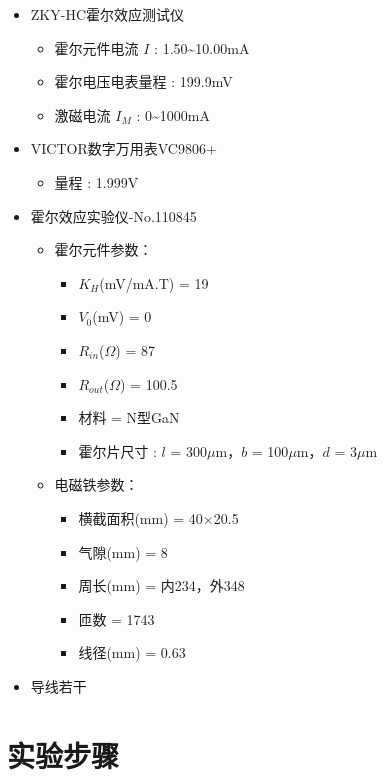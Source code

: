 \documentclass[UTF8]{ctexart}
\begin{document}
\begin{itemize}
    \item ZKY-HC霍尔效应测试仪
    \begin{itemize}
        \item 霍尔元件电流 $I$ : 1.50\~{}10.00mA
        \item 霍尔电压电表量程 : 199.9mV
        \item 激磁电流 $I_M$ : 0\~{}1000mA
    \end{itemize}
    \item VICTOR数字万用表VC9806+
    \begin{itemize}
        \item 量程 : 1.999V
    \end{itemize}
    \item 霍尔效应实验仪-No.110845
    \begin{itemize}
        \item 霍尔元件参数：
        \begin{itemize}
            \item $K_H$(mV/mA.T) = 19
            \item $V_0$(mV) = 0
            \item $R_{in}$($\Omega$) = 87
            \item $R_{out}$($\Omega$) = 100.5
            \item 材料 = N型GaN
            \item 霍尔片尺寸 : $l$ = 300$\mu$m，$b$ = 100$\mu$m，$d$ = 3$\mu$m
        \end{itemize}
        \item 电磁铁参数：
        \begin{itemize}
            \item 横截面积(mm) = 40$\times$20.5
            \item 气隙(mm) = 8
            \item 周长(mm) = 内234，外348
            \item 匝数 = 1743
            \item 线径(mm) = 0.63
        \end{itemize}
    \end{itemize}
    \item 导线若干
\end{itemize}

\section{实验步骤}
\end{document}
